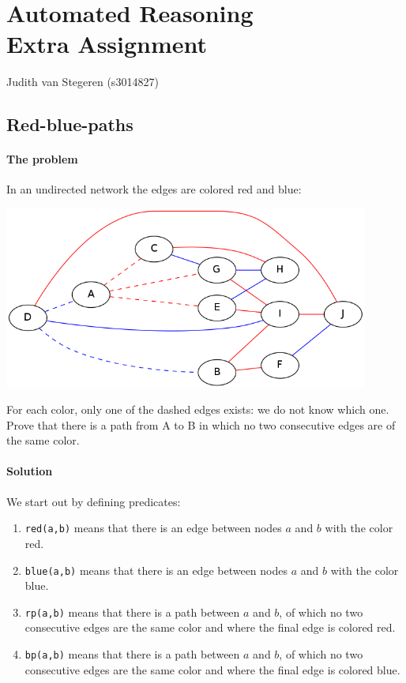 \documentclass[12pt]{article}
\begin{document}
\section*{Automated Reasoning\\Extra Assignment}

\begin{center}
Judith van Stegeren (s3014827)\\
\end{center}

\vspace{8mm}

\subsection*{Red-blue-paths}
\paragraph{The problem}
In an undirected network the edges are colored red and blue:\\
\begin{center}
\includegraphics[width=12cm]{graph.png}\\
\end{center}
For each color, only one of the dashed edges exists: we do not know which one.
Prove that there is a path from A to B in which no two consecutive edges are of the same color.

\paragraph{Solution}
We start out by defining predicates:
\begin{enumerate} 
\item \texttt{red(a,b)} means that there is an edge between nodes $a$ and $b$ with the color red. 
\item \texttt{blue(a,b)} means that there is an edge between nodes $a$ and $b$ with the color blue.
\item \texttt{rp(a,b)} means that there is a path between $a$ and $b$, of which no two consecutive edges are the same color and where the final edge is colored red.
\item \texttt{bp(a,b)} means that there is a path between $a$ and $b$, of which no two consecutive edges are the same color and where the final edge is colored blue.
\end{enumerate}
\end{document}
